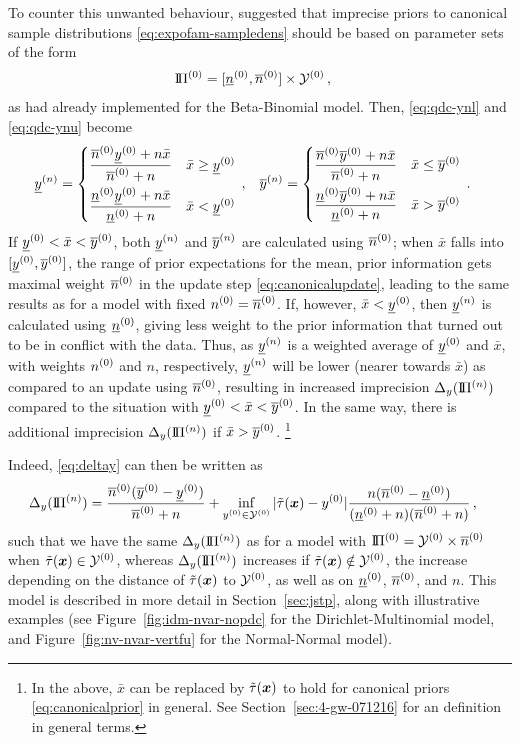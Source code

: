 To counter this unwanted behaviour,
\textcite{Walter2009a} suggested that imprecise priors to canonical sample distributions \eqref{eq:expofam-sampledens}
should be based on parameter sets of the form
\begin{align}
\label{equ:rectparamset}
\text{I}\!\Pi^{(0)} &= [\underline{n}^{(0)}, \overline{n}^{(0)}] \times \mathcal{Y}^{(0)}\,,
\end{align}
as \textcite[\S 5.4.3]{1991:walley} had already implemented for the Beta-Binomial model.
Then, \eqref{eq:qdc-ynl} and \eqref{eq:qdc-ynu} become
\begin{align*}
\underline{y}^{(n)} &= \begin{cases} \dfrac{\overline{n}^{(0)}\underline{y}^{(0)} + n\bar{x}}{\overline{n}^{(0)} + n} & \bar{x} \geq \underline{y}^{(0)} \\[2ex]
                      \dfrac{\underline{n}^{(0)}\underline{y}^{(0)} + n\bar{x}}{\underline{n}^{(0)} + n} & \bar{x} <    \underline{y}^{(0)} \end{cases}\,, &
\overline{y}^{(n)} &= \begin{cases} \dfrac{\overline{n}^{(0)}\overline{y}^{(0)} + n\bar{x}}{\overline{n}^{(0)} + n} & \bar{x} \leq \overline{y}^{(0)} \\[2ex]
                      \dfrac{\underline{n}^{(0)}\overline{y}^{(0)} + n\bar{x}}{\underline{n}^{(0)} + n} & \bar{x} >    \overline{y}^{(0)} \end{cases}\,.
\end{align*}
If $\underline{y}^{(0)} < \bar{x} < \overline{y}^{(0)}$, both $\underline{y}^{(n)}$ and $\overline{y}^{(n)}$ are calculated using $\overline{n}^{(0)}$;
when $\bar{x}$ falls into $[\underline{y}^{(0)}, \overline{y}^{(0)}]$, the range of prior expectations for the mean,
prior information gets maximal weight $\overline{n}^{(0)}$ in the update step \eqref{eq:canonicalupdate},
leading to the same results as for a model with fixed $n^{(0)} = \overline{n}^{(0)}$.
If, however, $\bar{x} < \underline{y}^{(0)}$, then $\underline{y}^{(n)}$ is calculated using $\underline{n}^{(0)}$,
giving less weight to the prior information that turned out to be in conflict with the data.
Thus, as $\underline{y}^{(n)}$ is a weighted average of $\underline{y}^{(0)}$ and $\bar{x}$, with weights $n^{(0)}$ and $n$, respectively,
$\underline{y}^{(n)}$ will be lower (nearer towards $\bar{x}$) as compared to an update using $\overline{n}^{(0)}$,
resulting in increased imprecision $\Delta_y(\text{I}\!\Pi^{(n)})$ compared to the situation with $\underline{y}^{(0)} < \bar{x} < \overline{y}^{(0)}$.
In the same way, there is additional imprecision $\Delta_y(\text{I}\!\Pi^{(n)})$ if $\bar{x} > \overline{y}^{(0)}$.%
\footnote{In the above, $\bar{x}$ can be replaced by $\tilde{\tau}({\bm x})$
to hold for canonical priors \eqref{eq:canonicalprior} in general.
See Section~\ref{sec:4-gw-071216} for an definition in general terms.}

Indeed, \eqref{eq:deltay} can then be written as
\begin{align*}
\Delta_y(\text{I}\!\Pi^{(n)}) &= \frac{\overline{n}^{(0)} (\overline{y}^{(0)} - \underline{y}^{(0)})}{\overline{n}^{(0)} + n} + \inf_{y^{(0)} \in \mathcal{Y}^{(0)}} |\tilde{\tau}({\bm x}) - y^{(0)}| \frac{n (\overline{n}^{(0)} - \underline{n}^{(0)})}{(\underline{n}^{(0)} + n)(\overline{n}^{(0)} + n)}\,,
\end{align*}
such that we have the same $\Delta_y(\text{I}\!\Pi^{(n)})$ as for a model with $\text{I}\!\Pi^{(0)} = \mathcal{Y}^{(0)} \times \overline{n}^{(0)}$ when $\tilde{\tau}({\bm x}) \in \mathcal{Y}^{(0)}$,
whereas $\Delta_y(\text{I}\!\Pi^{(n)})$ increases if $\tilde{\tau}({\bm x}) \notin \mathcal{Y}^{(0)}$, the increase depending on the distance of $\tilde{\tau}({\bm x})$ to $\mathcal{Y}^{(0)}$,
as well as on $\underline{n}^{(0)}$, $\overline{n}^{(0)}$, and $n$.
This model is described in more detail in Section~\ref{sec:jstp}, along with illustrative examples
(see Figure~\ref{fig:idm-nvar-nopdc} for the Dirichlet-Multinomial model,
and Figure~\ref{fig:nv-nvar-vertfu} for the Normal-Normal model).

